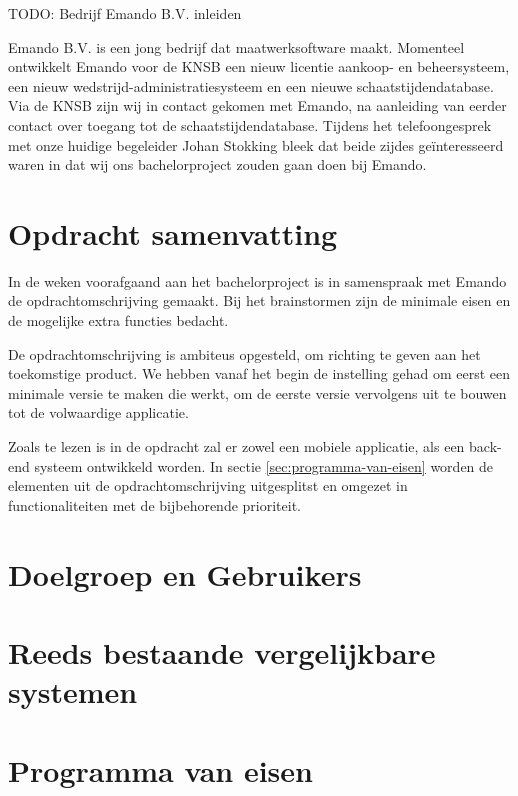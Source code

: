 {\par \bigskip \par \color{red} TODO: Bedrijf Emando B.V. inleiden \par \bigskip \par }
Emando B.V. is een jong bedrijf dat maatwerksoftware maakt. Momenteel ontwikkelt Emando voor de \ac{KNSB} een nieuw licentie aankoop- en beheersysteem, een nieuw wedstrijd-administratiesysteem en een nieuwe schaatstijdendatabase. Via de \ac{KNSB} zijn wij in contact gekomen met Emando, na aanleiding van eerder contact over toegang tot de schaatstijdendatabase. Tijdens het telefoongesprek met onze huidige begeleider Johan Stokking bleek dat beide zijdes geïnteresseerd waren in dat wij ons bachelorproject zouden gaan doen bij Emando.

\section{Opdracht samenvatting}
In de weken voorafgaand aan het bachelorproject is in samenspraak met Emando de opdrachtomschrijving gemaakt. Bij het brainstormen zijn de minimale eisen en de mogelijke extra functies bedacht. 



De opdrachtomschrijving is ambiteus opgesteld, om richting te geven aan het toekomstige product. We hebben vanaf het begin de instelling gehad om eerst een minimale versie te maken die werkt, om de eerste versie vervolgens uit te bouwen tot de volwaardige applicatie.

Zoals te lezen is in de opdracht zal er zowel een mobiele applicatie, als een back-end systeem ontwikkeld worden. In sectie \ref{sec:programma-van-eisen} worden de elementen uit de opdrachtomschrijving uitgesplitst en omgezet in functionaliteiten met de bijbehorende prioriteit.

\section{Doelgroep en Gebruikers}



\section{Reeds bestaande vergelijkbare systemen}


    
\section{Programma van eisen} %


